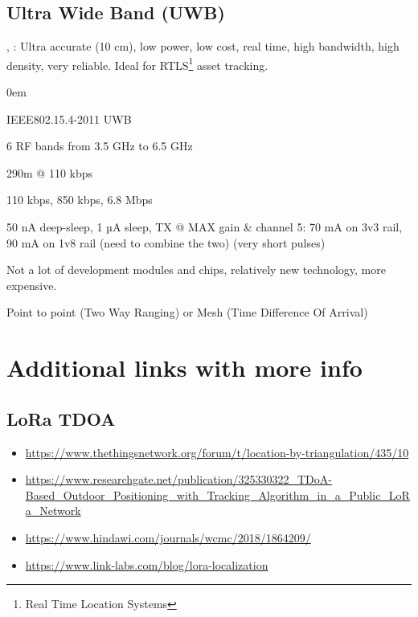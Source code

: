 \documentclass[11pt,a4paper,twoside]{article} %
\begin{document}
\subsection{Ultra Wide Band (UWB)}
\cite{DW1000}, \cite{DW}: Ultra accurate (10 cm), low power, low cost, real time, high bandwidth, high density, very reliable. Ideal for RTLS\footnote{Real Time Location Systems} asset tracking.
\vspace{-0.5cm}
\begin{description}
	\itemsep0em
	\item [Standard] IEEE802.15.4-2011 UWB
	\item [Frequency] 6 RF bands from 3.5 GHz to 6.5 GHz
	\item [Range] 290m @ 110 kbps
	\item [Bitrate] 110 kbps, 850 kbps, 6.8 Mbps
	\item [Power Usage] 50 nA deep-sleep, 1 µA sleep, TX @ MAX gain \& channel 5: 70 mA on 3v3 rail, 90 mA on 1v8 rail (need to combine the two) (very short pulses)
	\item [Infrastructure] Not a lot of development modules and chips, relatively new technology, more expensive.
	\item [Network topology] Point to point (Two Way Ranging) or Mesh (Time Difference Of Arrival)
\end{description}

\clearpage


\section{Additional links with more info}

\subsection{LoRa TDOA}

{
	\footnotesize
	\begin{itemize}
		\itemsep0em
		\item \url{https://www.thethingsnetwork.org/forum/t/location-by-triangulation/435/10}
		\item \url{https://www.researchgate.net/publication/325330322_TDoA-Based_Outdoor_Positioning_with_Tracking_Algorithm_in_a_Public_LoRa_Network}
		\item \url{https://www.hindawi.com/journals/wcmc/2018/1864209/}
		\item \url{https://www.link-labs.com/blog/lora-localization}
	\end{itemize}
}
\end{document}

